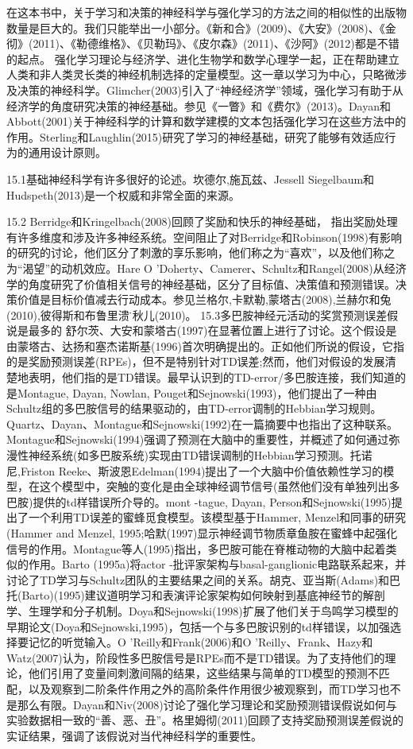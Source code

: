 在这本书中，关于学习和决策的神经科学与强化学习的方法之间的相似性的出版物数量是巨大的。我们只能举出一小部分。《新和合》(2009)、《大安》(2008)、《金彻》(2011)、《勒德维格》、《贝勒玛》、《皮尔森》(2011)、《沙阿》(2012)都是不错的起点。
强化学习理论与经济学、进化生物学和数学心理学一起，正在帮助建立人类和非人类灵长类的神经机制选择的定量模型。这一章以学习为中心，只略微涉及决策的神经科学。Glimcher(2003)引入了“神经经济学”领域，强化学习有助于从经济学的角度研究决策的神经基础。参见《一瞥》和《费尔》(2013)。Dayan和Abbott(2001)关于神经科学的计算和数学建模的文本包括强化学习在这些方法中的作用。Sterling和Laughlin(2015)研究了学习的神经基础，研究了能够有效适应行为的通用设计原则。

15.1基础神经科学有许多很好的论述。坎德尔,施瓦兹、Jessell
Siegelbaum和Hudspeth(2013)是一个权威和非常全面的来源。

15.2 Berridge和Kringelbach(2008)回顾了奖励和快乐的神经基础，
指出奖励处理有许多维度和涉及许多神经系统。空间阻止了对Berridge和Robinson(1998)有影响的研究的讨论，他们区分了刺激的享乐影响，他们称之为“喜欢”，以及他们称之为“渴望”的动机效应。Hare O 'Doherty、Camerer、Schultz和Rangel(2008)从经济学的角度研究了价值相关信号的神经基础，区分了目标值、决策值和预测错误。决策价值是目标价值减去行动成本。参见兰格尔,卡默勒,蒙塔古(2008),兰赫尔和兔(2010),彼得斯和布鲁里溃疡̈秋儿(2010)。
15.3多巴胺神经元活动的奖赏预测误差假说是最多的
舒尔茨、大安和蒙塔古(1997)在显著位置上进行了讨论。这个假设是由蒙塔古、达扬和塞杰诺斯基(1996)首次明确提出的。正如他们所说的假设，它指的是奖励预测误差(RPEs)，但不是特别针对TD误差;然而，他们对假设的发展清楚地表明，他们指的是TD错误。最早认识到的TD-error/多巴胺连接，我们知道的是Montague, Dayan, Nowlan, Pouget和Sejnowski(1993)，他们提出了一种由Schultz组的多巴胺信号的结果驱动的，由TD-error调制的Hebbian学习规则。Quartz、Dayan、Montague和Sejnowski(1992)在一篇摘要中也指出了这种联系。Montague和Sejnowski(1994)强调了预测在大脑中的重要性，并概述了如何通过弥漫性神经系统(如多巴胺系统)实现由TD错误调制的Hebbian学习预测。托诺尼,Friston Reeke、斯波恩Edelman(1994)提出了一个大脑中价值依赖性学习的模型，在这个模型中，突触的变化是由全球神经调节信号(虽然他们没有单独列出多巴胺)提供的td样错误所介导的。mont -tague, Dayan, Person和Sejnowski(1995)提出了一个利用TD误差的蜜蜂觅食模型。该模型基于Hammer, Menzel和同事的研究(Hammer and Menzel, 1995;哈默(1997)显示神经调节物质章鱼胺在蜜蜂中起强化信号的作用。Montague等人(1995)指出，多巴胺可能在脊椎动物的大脑中起着类似的作用。Barto (1995a)将actor -批评家架构与basal-ganglionic电路联系起来，并讨论了TD学习与Schultz团队的主要结果之间的关系。胡克、亚当斯(Adams)和巴托(Barto)(1995)建议道明学习和表演评论家架构如何映射到基底神经节的解剖学、生理学和分子机制。Doya和Sejnowski(1998)扩展了他们关于鸟鸣学习模型的早期论文(Doya和Sejnowski,1995)，包括一个与多巴胺识别的td样错误，以加强选择要记忆的听觉输入。O 'Reilly和Frank(2006)和O 'Reilly、Frank、Hazy和Watz(2007)认为，阶段性多巴胺信号是RPEs而不是TD错误。为了支持他们的理论，他们引用了变量间刺激间隔的结果，这些结果与简单的TD模型的预测不匹配，以及观察到二阶条件作用之外的高阶条件作用很少被观察到，而TD学习也不是那么有限。Dayan和Niv(2008)讨论了强化学习理论和奖励预测错误假说如何与实验数据相一致的“善、恶、丑”。格里姆彻(2011)回顾了支持奖励预测误差假说的实证结果，强调了该假说对当代神经科学的重要性。

